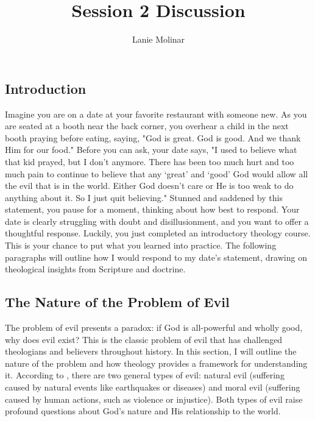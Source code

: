 \documentclass[stu,12pt,floatsintext]{apa7}
\title{Session 2 Discussion}
\author{Lanie Molinar}
\begin{document}
\maketitle
\thispagestyle{plain}
\pagestyle{plain}

\subsection{Introduction}


Imagine you are on a date at your favorite restaurant with someone new. As you are seated at a booth near the back corner, you overhear a child in the next booth praying before eating, saying, "God is great. God is good. And we thank Him for our food." Before you can ask, your date says, "I used to believe what that kid prayed, but I don’t anymore. There has been too much hurt and too much pain to continue to believe that any ‘great’ and ‘good’ God would allow all the evil that is in the world. Either God doesn't care or He is too weak to do anything about it. So I just quit believing." Stunned and saddened by this statement, you pause for a moment, thinking about how best to respond. Your date is clearly struggling with doubt and disillusionment, and you want to offer a thoughtful response. Luckily, you just completed an introductory theology course. This is your chance to put what you learned into practice. The following paragraphs will outline how I would respond to my date's statement, drawing on theological insights from Scripture and doctrine.

\subsection{The Nature of the Problem of Evil}

The problem of evil presents a paradox: if God is all-powerful and wholly good, why does evil exist? This is the classic problem of evil that has challenged theologians and believers throughout history. In this section, I will outline the nature of the problem and how theology provides a framework for understanding it. According to \textcite[chapter 15]{ericksonIntroducingChristianDoctrine2015}, there are two general types of evil: natural evil (suffering caused by natural events like earthquakes or diseases) and moral evil (suffering caused by human actions, such as violence or injustice). Both types of evil raise profound questions about God’s nature and His relationship to the world.
\end{document}
